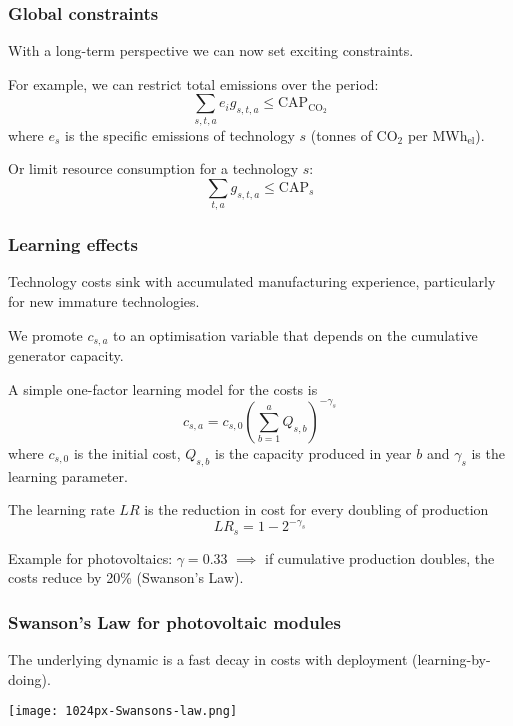 \documentclass[10pt,aspectratio=169,dvipsnames]{beamer}
\begin{document}
\begin{frame}
  \frametitle{Global constraints}

  With a long-term perspective we can now set exciting constraints.

  For example, we can restrict total \alert{emissions} over the period:
  \begin{equation*}
    \sum_{s,t,a} e_i g_{s,t,a}\leq \textrm{CAP}_{\textrm{CO}_2}
  \end{equation*}
  where $e_s$ is the specific emissions of technology $s$ (tonnes of CO$_2$ per MWh$_{\textrm{el}}$).

  Or limit \alert{resource consumption} for a technology $s$:
  \begin{equation*}
    \sum_{t,a} g_{s,t,a}\leq \textrm{CAP}_{s}
  \end{equation*}
\end{frame}


\begin{frame}
  \frametitle{Learning effects}

  Technology costs sink with accumulated manufacturing experience, particularly for new immature technologies.

  We promote $c_{s,a}$ to an optimisation variable that depends on the cumulative generator capacity.

 A simple \alert{one-factor learning model} for the costs is
  \begin{equation*}
    c_{s,a} = c_{s,0} \left(\sum_{b=1}^a Q_{s,b} \right)^{-\gamma_s}
  \end{equation*}
  where $c_{s,0}$ is the initial cost, $Q_{s,b}$ is the capacity produced in year $b$ and $\gamma_s$ is the \alert{learning parameter}.

  The \alert{learning rate} $LR$ is the reduction in cost for every doubling of production
  \begin{equation*}
    LR_s = 1-2^{-\gamma_s}
  \end{equation*}

  Example for photovoltaics: $\gamma = 0.33$ $\implies$ if cumulative production doubles, the costs reduce by 20\% (\alert{Swanson's Law}).

\end{frame}


\begin{frame}
  \frametitle{Swanson's Law for photovoltaic modules}

  The underlying dynamic is a fast decay in costs with deployment (\alert{learning-by-doing}).

  \vspace{.2cm}

  \centering
      \texttt{[image: 1024px-Swansons-law.png]}
\end{frame}
\end{document}
